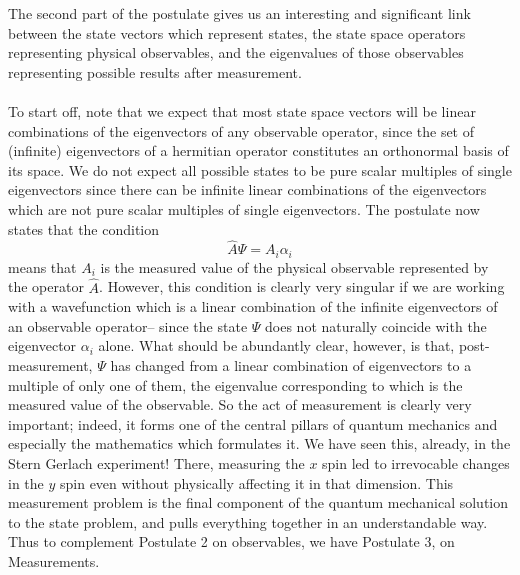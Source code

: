 The second part of the postulate gives us an interesting and significant link between the state vectors which represent states, the state space operators representing physical observables, and the eigenvalues of those observables representing possible results after measurement. 
\\\\
To start off, note that we expect that most state space vectors will be linear combinations of the eigenvectors of any observable operator, since the set of (infinite) eigenvectors of a hermitian operator constitutes an orthonormal basis of its space. We do not expect all possible states to be pure scalar multiples of single eigenvectors since there can be infinite linear combinations of the eigenvectors which are not pure scalar multiples of single eigenvectors. 
The postulate now states that the condition
\[
\hat{A}\Psi=A_{i}\alpha_{i}\]
means that $A_{i}$ is the measured value of the physical observable represented by the operator $\hat{A}$. However, this condition is clearly very singular if we are working with a wavefunction which is a linear combination of the infinite eigenvectors of an observable operator-- since the state $\Psi$ does not naturally coincide with the eigenvector $\alpha_{i}$ alone. What should be abundantly clear, however, is that, post-measurement, $\Psi$ has changed from a linear combination of eigenvectors to a multiple of only one of them, the eigenvalue corresponding to which is the measured value of the observable. So the act of measurement is clearly very important; indeed, it forms one of the central pillars of quantum mechanics and especially the mathematics which formulates it. We have seen this, already, in the Stern Gerlach experiment! There, measuring the $x$ spin led to irrevocable changes in the $y$ spin even without physically affecting it in that dimension. This measurement problem is the final component of the quantum mechanical solution to the state problem, and pulls everything together in an understandable way. Thus to complement Postulate 2 on observables, we have Postulate 3, on Measurements.

